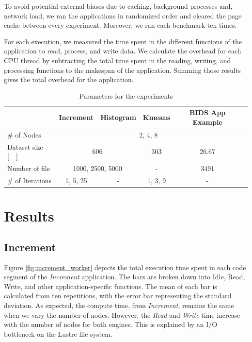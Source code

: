 \documentclass[conference]{IEEEtran}
\begin{document}
To avoid potential external biases due to caching, background processes and,
network load, we ran the applications in randomized order and cleared the
page cache between every experiment.
Moreover, we ran each benchmark ten times.
		
For each execution, we measured the time spent in the different functions of the
application to read, process, and write data.
We calculate the overhead for each CPU thread by subtracting the total time
spent in the reading, writing, and processing functions to the makespan of the application.
Summing those results gives the total overhead for the application.
		
\begin{table}[t]
	\renewcommand{\arraystretch}{1.5}
	\caption{Parameters for the experiments}\label{table:parameters}
	\centering
	\begin{tabular}{|l|c|c|c|c|c|}
		\hline           & Increment & Histogram & Kmeans  & BIDS App Example \\\hline
		\# of Nodes & \multicolumn{4}{c|}{2, 4, 8} \\\hline
		Dataset size [\SI{}{\gibi\byte}] &\multicolumn{2}{c|}{606} & 303 & \multicolumn{1}{c|}{26.67} \\\hline
		Number of file & \multicolumn{2}{c|}{1000, 2500, 5000} & - & \multicolumn{1}{c|}{3491} \\\hline
		\# of Iterations & 1, 5, 25  & -         & 1, 3, 9 & -                \\\hline
	\end{tabular}
\end{table}
		
\section{Results}
\subsection{Increment}
Figure \ref{fig:increment_worker} depicts the total execution time spent in each code segment of the \textit{Increment} application.
The bars are broken down into Idle, Read, Write, and other application-specific functions.
The mean of each bar is calculated from ten repetitions, with the error bar representing the standard deviation.
As expected, the compute time, from \textit{Increment}, remains the same when we vary the number of nodes.
However, the \textit{Read} and \textit{Write} time increase with the number of nodes for both engines.
This is explained by an I/O bottleneck on the Lustre file system.
		
\end{document}
